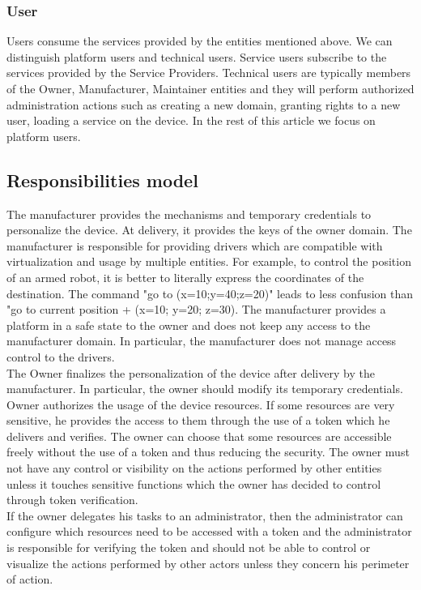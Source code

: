 \documentclass[conference]{IEEEtran}
\begin{document}
\subsubsection{User}
Users consume the services provided by the entities mentioned above. We can distinguish platform users and technical users. Service users subscribe to the services provided by the Service Providers. Technical users are typically members of the Owner, Manufacturer, Maintainer entities and they will perform authorized administration actions such as creating a new domain, granting rights to a new user, loading a service on the device. In the rest of this article we focus on platform users. 
\subsection{Responsibilities model}
\label{sec:Resp_model}

The manufacturer provides the mechanisms and temporary credentials to personalize the device. At delivery, it provides the keys of the owner domain. The manufacturer is responsible for providing drivers which are compatible with virtualization and usage by multiple entities. For example, to control the position of an armed robot, it is better to literally express the coordinates of the destination. The command "go to (x=10;y=40;z=20)" leads to less confusion than "go to current position + (x=10; y=20; z=30). The manufacturer provides a platform in a safe state to the owner and does not keep any access to the manufacturer domain. In particular, the manufacturer does not manage access control to the drivers.\\

The Owner finalizes the personalization of the device after delivery by the manufacturer. In particular, the owner should modify its temporary credentials. Owner authorizes the usage of the device resources. If some resources are very sensitive, he provides the access to them through the use of a token which he delivers and verifies. The owner can choose that some resources are accessible freely without the use of a token and thus reducing the security. The owner must not have any control or visibility on the actions performed by other entities unless it touches sensitive functions which the owner has decided to control through token verification.\\

If the owner delegates his tasks to an administrator, then the administrator can configure which resources need to be accessed with a token and the administrator is responsible for verifying the token and should not be able to control or visualize the actions performed by other actors unless they concern his perimeter of action.\\
\end{document}
